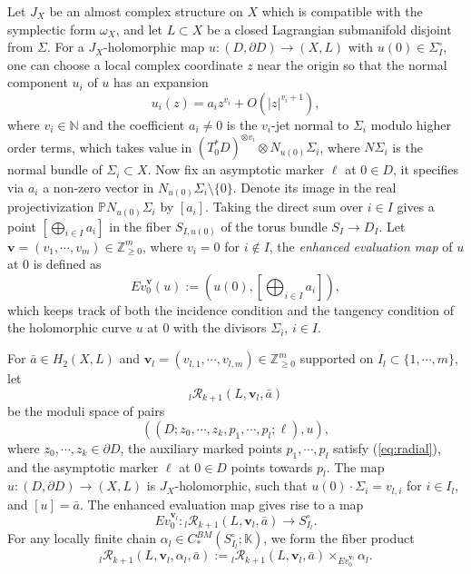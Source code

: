 \documentclass[a4paper]{article}
\numberwithin{equation}{section}
\begin{document}
Let $J_X$ be an almost complex structure on $X$ which is compatible with the symplectic form $\omega_X$, and let $L\subset X$ be a closed Lagrangian submanifold disjoint from $\Sigma$. For a $J_X$-holomorphic map $u:(D,\partial D)\rightarrow(X,L)$ with $u(0)\in\Sigma_I^\circ$, one can choose a local complex coordinate $z$ near the origin so that the normal component $u_i$ of $u$ has an expansion
\begin{equation}
u_i(z)=a_iz^{v_i}+O(|z|^{v_i+1}),
\end{equation}
where $v_i\in\mathbb{N}$ and the coefficient $a_i\neq0$ is the $v_i$-jet normal to $\Sigma_i$ modulo higher order terms, which takes value in $(T_0^\ast D)^{\otimes v_i}\otimes N_{u(0)}\Sigma_i$, where $N\Sigma_i$ is the normal bundle of $\Sigma_i\subset X$. Now fix an asymptotic marker $\ell$ at $0\in D$, it specifies via $a_i$ a non-zero vector in $N_{u(0)}\Sigma_i\setminus\{0\}$. Denote its image in the real projectivization $\mathbb{P}N_{u(0)}\Sigma_i$ by $[a_i]$. Taking the direct sum over $i\in I$ gives a point $\left[\bigoplus_{i\in I}a_i\right]$ in the fiber $S_{I,u(0)}$ of the torus bundle $S_I\rightarrow D_I$. Let $\mathbf{v}=(v_1,\cdots,v_m)\in\mathbb{Z}_{\geq0}^m$, where $v_i=0$ for $i\notin I$, the \textit{enhanced evaluation map} of $u$ at $0$ is defined as
\begin{equation}
\mathit{Ev}_0^\mathbf{v}(u):=\left(u(0),\left[\bigoplus_{i\in I}a_i\right]\right),
\end{equation}
which keeps track of both the incidence condition and the tangency condition of the holomorphic curve $u$ at $0$ with the divisors $\Sigma_i$, $i\in I$.

For $\bar{a}\in H_2(X,L)$ and $\mathbf{v}_l=(v_{l,1},\cdots,v_{l,m})\in\mathbb{Z}_{\geq0}^m$ supported on $I_l\subset\{1,\cdots,m\}$, let
\begin{equation}
{}_l\mathcal{R}_{k+1}(L,\mathbf{v}_l,\bar{a})
\end{equation}
be the moduli space of pairs
\begin{equation}
\left((D;z_0,\cdots,z_k,p_1,\cdots,p_l;\ell),u\right),
\end{equation}
where $z_0,\cdots,z_k\in\partial D$, the auxiliary marked points $p_1,\cdots,p_l$ satisfy (\ref{eq:radial}), and the asymptotic marker $\ell$ at $0\in D$ points towards $p_l$. The map $u:(D,\partial D)\rightarrow(X,L)$ is $J_X$-holomorphic, such that $u(0)\cdot\Sigma_i=v_{l,i}$ for $i\in I_l$, and $[u]=\bar{a}$. The enhanced evaluation map gives rise to a map
\begin{equation}
\mathit{Ev}_0^{\mathbf{v}_l}:{}_l\mathcal{R}_{k+1}(L,\mathbf{v}_l,\bar{a})\rightarrow S_{I_l}^\circ.
\end{equation}
For any locally finite chain $\alpha_l\in C_\ast^\mathit{BM}(S_{I_l}^\circ;\mathbb{K})$, we form the fiber product
\begin{equation}
{}_l\mathcal{R}_{k+1}(L,\mathbf{v}_l,\alpha_l,\bar{a}):={}_l\mathcal{R}_{k+1}(L,\mathbf{v}_l,\bar{a})\times_{\mathit{Ev}_0^{\mathbf{v}_l}}\alpha_l.
\end{equation}
\end{document}
